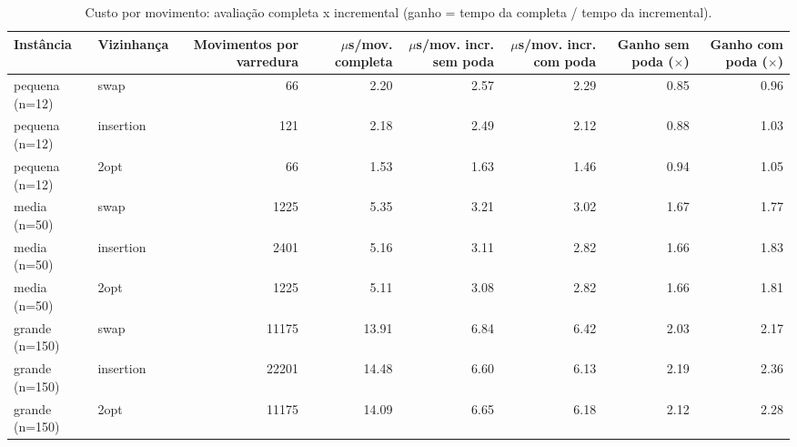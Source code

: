 \begin{table}[ht]
\centering
\small
\caption{Custo por movimento: avaliação completa x incremental (ganho = tempo da completa / tempo da incremental).}
\label{tab:custo_movimento}
\begin{tabular}{llrrrrrr}
\hline
Instância & Vizinhança & Movimentos por varredura & $\mu$s/mov. completa & $\mu$s/mov. incr. sem poda & $\mu$s/mov. incr. com poda & Ganho sem poda ($\times$) & Ganho com poda ($\times$) \\
\hline
pequena (n=12) & swap & 66 & 2.20 & 2.57 & 2.29 & 0.85 & 0.96 \\
pequena (n=12) & insertion & 121 & 2.18 & 2.49 & 2.12 & 0.88 & 1.03 \\
pequena (n=12) & 2opt & 66 & 1.53 & 1.63 & 1.46 & 0.94 & 1.05 \\
\hline
media (n=50) & swap & 1225 & 5.35 & 3.21 & 3.02 & 1.67 & 1.77 \\
media (n=50) & insertion & 2401 & 5.16 & 3.11 & 2.82 & 1.66 & 1.83 \\
media (n=50) & 2opt & 1225 & 5.11 & 3.08 & 2.82 & 1.66 & 1.81 \\
\hline
grande (n=150) & swap & 11175 & 13.91 & 6.84 & 6.42 & 2.03 & 2.17 \\
grande (n=150) & insertion & 22201 & 14.48 & 6.60 & 6.13 & 2.19 & 2.36 \\
grande (n=150) & 2opt & 11175 & 14.09 & 6.65 & 6.18 & 2.12 & 2.28 \\
\hline
\end{tabular}
\end{table}
